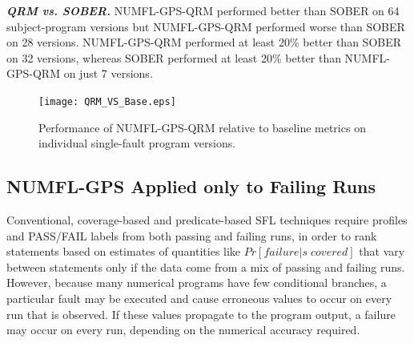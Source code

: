 \documentclass[times]{stvrauth}
\begin{document}
\textit{\textbf{ QRM vs. SOBER.}}  NUMFL-GPS-QRM performed better than SOBER on 64 subject-program versions but NUMFL-GPS-QRM performed worse than SOBER on 28 versions.  NUMFL-GPS-QRM performed at least 20\% better than SOBER on 32 versions, whereas SOBER performed at least 20\% better than NUMFL-GPS-QRM on just 7 versions.
\begin{figure}[!thpb]
\centering
\texttt{[image: QRM\_VS\_Base.eps]}
\caption{Performance of NUMFL-GPS-QRM relative to baseline metrics on individual single-fault program versions.}
\label{QRM_VS_Base}
\end{figure}

\subsection{NUMFL-GPS Applied only to Failing Runs}\label{VE}
Conventional, coverage-based and predicate-based SFL techniques require profiles and PASS/FAIL labels from both passing and failing runs, in order to rank statements based on estimates of quantities like $Pr⁡[failure|s\;covered]$ \cite{Baah2010} that vary between statements only if the data come from a mix of passing and failing runs.  However, because many numerical programs have few conditional branches, a particular fault may be executed and cause erroneous values to occur on every run that is observed.  If these values propagate to the program output, a failure may occur on every run, depending on the numerical accuracy required.
\end{document}
